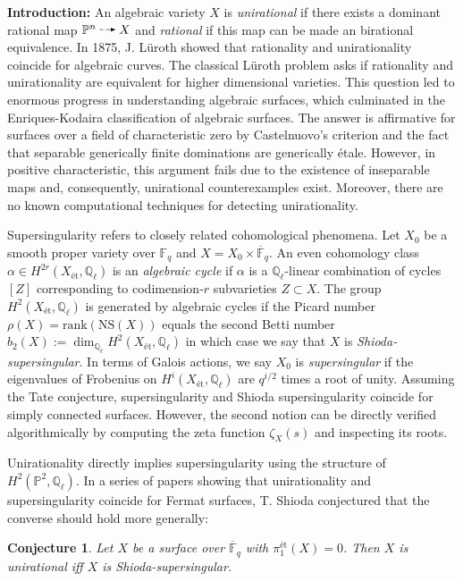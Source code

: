 \documentclass[11pt]{article}
\newcommand{\et}{\text{\'{e}t}}
\newcommand{\etale}{\'{e}tale\xspace}
\newcommand{\Q}{\mathbb{Q}}
\renewcommand{\P}{\mathbb{P}}
\newcommand{\NS}[1]{\mathrm{NS}\left( #1 \right)}
\newcommand*{\DashedArrow}[1][]{\mathbin{\tikz [baseline=-0.25ex,-latex, dashed,#1] \draw [#1] (0pt,0.5ex) -- (1.3em,0.5ex);}}%
\newcommand{\rat}{\DashedArrow[densely dashdotted]}
\newtheorem*{conj}{Conjecture}
\begin{document}
\textbf{Introduction:}
An algebraic variety $X$ is \textit{unirational} if there exists a dominant rational map $\P^n \rat X$ and \textit{rational} if this map can be made an birational equivalence. In 1875, J. L\"{u}roth showed  that rationality and unirationality coincide for algebraic curves. The classical L\"{u}roth problem asks if rationality and unirationality are equivalent for higher dimensional varieties. This question led to enormous progress in understanding algebraic surfaces, which culminated in the Enriques-Kodaira classification of algebraic surfaces.
The answer is affirmative for surfaces over a field of characteristic zero by Castelnuovo's criterion and the fact that separable generically finite dominations are generically \etale. However, in positive characteristic, this argument fails due to the existence of inseparable maps and, consequently, unirational counterexamples exist. Moreover, there are no known computational techniques for detecting unirationality.
\par
Supersingularity refers to closely related cohomological phenomena. Let $X_0$ be a smooth proper variety over $\mathbb{F}_q$ and $X = X_0 \times \overline{\mathbb{F}}_q$. An even cohomology class $\alpha \in H^{2r}(X_{\et}, \Q_\ell)$ is an \textit{algebraic cycle} if $\alpha$ is a $\Q_\ell$-linear combination of cycles $[Z]$ corresponding to codimension-$r$ subvarieties $Z \subset X$. The group $H^2(X_{\et}, \Q_{\ell})$ is generated by algebraic cycles if the Picard number $\rho(X) = \mathrm{rank}(\NS{X})$ equals the second Betti number $b_2(X) := \dim_{\Q_\ell} H^2(X_{\et}, \Q_\ell)$ in which case we say that $X$ is \textit{Shioda-supersingular}. In terms of Galois actions, we say $X_0$ is \textit{supersingular} if the eigenvalues of Frobenius on $H^{i}(X_{\et}, \Q_\ell)$ are $q^{i/2}$ times a root of unity. Assuming the Tate conjecture, supersingularity and Shioda supersingularity coincide for simply connected surfaces.
However, the second notion can be directly verified algorithmically by computing the zeta function $\zeta_X(s)$ and inspecting its roots.
\par
Unirationality directly implies supersingularity using the structure of $H^2(\P^2, \Q_\ell)$. In a series of papers showing that unirationality and supersingularity coincide for Fermat surfaces, T. Shioda conjectured  that the converse should hold more generally:
\begin{conj}
Let $X$ be a surface over $\overline{\mathbb{F}}_q$ with $\pi_1^{\et}(X) = 0$. Then $X$ is unirational iff $X$ is Shioda-supersingular.
\end{conj}
\end{document}
